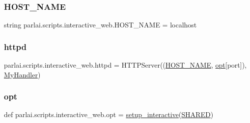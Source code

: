 \mbox{\label{namespaceparlai_1_1scripts_1_1interactive__web_ac440a61641ae161806beba8dbb9d39b8}} 
\subsubsection{\texorpdfstring{H\+O\+S\+T\+\_\+\+N\+A\+ME}{HOST\_NAME}}
{\footnotesize\ttfamily string parlai.\+scripts.\+interactive\+\_\+web.\+H\+O\+S\+T\+\_\+\+N\+A\+ME = \textquotesingle{}localhost\textquotesingle{}}

\mbox{\label{namespaceparlai_1_1scripts_1_1interactive__web_af01d14f8f733bc94f7aaab006021b83b}} 
\subsubsection{\texorpdfstring{httpd}{httpd}}
{\footnotesize\ttfamily parlai.\+scripts.\+interactive\+\_\+web.\+httpd = H\+T\+T\+P\+Server((\hyperlink{namespaceparlai_1_1scripts_1_1interactive__web_ac440a61641ae161806beba8dbb9d39b8}{H\+O\+S\+T\+\_\+\+N\+A\+ME}, \hyperlink{namespaceparlai_1_1scripts_1_1interactive__web_a022cc4d0c500e7a2ba643446d3b0e6ef}{opt}\mbox{[}\textquotesingle{}port\textquotesingle{}\mbox{]}), \hyperlink{classparlai_1_1scripts_1_1interactive__web_1_1MyHandler}{My\+Handler})}

\mbox{\label{namespaceparlai_1_1scripts_1_1interactive__web_a022cc4d0c500e7a2ba643446d3b0e6ef}} 
\subsubsection{\texorpdfstring{opt}{opt}}
{\footnotesize\ttfamily def parlai.\+scripts.\+interactive\+\_\+web.\+opt = \hyperlink{namespaceparlai_1_1scripts_1_1interactive__web_abeab09cab4f9e60077ffd5050bff36ef}{setup\+\_\+interactive}(\hyperlink{namespaceparlai_1_1scripts_1_1interactive__web_a86b356c6390faf2398bdbde02a6664d6}{S\+H\+A\+R\+ED})}

